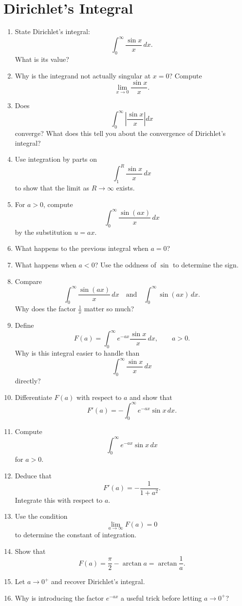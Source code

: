 \section{Dirichlet's Integral}

\begin{enumerate}
  \item State Dirichlet's integral:
    \[ \int_{0}^{\infty} \frac{\sin x}{x}\,dx. \]
    What is its value?
  \item Why is the integrand not actually singular at \(x=0\)? Compute
    \[ \lim_{x\to 0}\frac{\sin x}{x}. \]
  \item Does
    \[ \int_{0}^{\infty} \left|\frac{\sin x}{x}\right|dx \]
    converge? What does this tell you about the convergence of Dirichlet's integral?
  \item Use integration by parts on
    \[ \int_{1}^{R} \frac{\sin x}{x}\,dx \]
    to show that the limit as \(R\to\infty\) exists.

  \item For \(a>0\), compute
    \[ \int_{0}^{\infty} \frac{\sin(ax)}{x}\,dx \]
    by the substitution \(u=ax\).
  \item What happens to the previous integral when \(a=0\)?
  \item What happens when \(a<0\)? Use the oddness of \(\sin\) to determine the sign.
  \item Compare
    \[ \int_{0}^{\infty} \frac{\sin(ax)}{x}\,dx \quad\text{and}\quad \int_{0}^{\infty} \sin(ax)\,dx. \]
    Why does the factor \(\tfrac{1}{x}\) matter so much?

  \item Define
    \[ F(a)=\int_{0}^{\infty} e^{-ax}\frac{\sin x}{x}\,dx, \qquad a>0. \]
    Why is this integral easier to handle than
    \[ \int_{0}^{\infty} \frac{\sin x}{x}\,dx \]
    directly?
  \item Differentiate \(F(a)\) with respect to \(a\) and show that
    \[ F'(a)=-\int_{0}^{\infty} e^{-ax}\sin x\,dx. \]
  \item Compute
    \[ \int_{0}^{\infty} e^{-ax}\sin x\,dx \]
    for \(a>0\).
  \item Deduce that
    \[ F'(a)=-\frac{1}{1+a^{2}}. \]
    Integrate this with respect to \(a\).
  \item Use the condition
    \[ \lim_{a\to\infty}F(a)=0 \]
    to determine the constant of integration.
  \item Show that
    \[ F(a)=\frac{\pi}{2}-\arctan a=\arctan\frac{1}{a}. \]
  \item Let \(a\to 0^{+}\) and recover Dirichlet's integral.
  \item Why is introducing the factor \(e^{-ax}\) a useful trick before letting \(a\to 0^{+}\)?


\end{enumerate}
